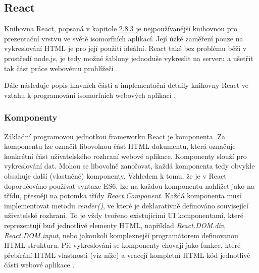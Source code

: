 \subsection{React}
\label{sec:react_isomorphic}
Knihovna React, popsaná v kapitole \hyperref[sec:react]{2.8.3} je nejpoužívanější knihovnou pro prezentační vrstvu ve světě isomorfních aplikací. Její úzké zaměření pouze na vykreslování HTML je pro její použití ideální. React také bez problému běží v prostředí node.js, je tedy možné šablony jednoduše vykreslit na serveru a ušetřit tak část práce webovému prohlížeči \cite{react} \cite{react_intro}.
 
Dále následuje popis hlavních částí a implementační detaily knihovny React ve vztahu k programování isomorfních webových aplikací \cite{isomorhic_book}.

\subsubsection{Komponenty}
Základní programovou jednotkou frameworku React je komponenta. Za komponentu lze označit libovolnou část HTML dokumentu, která označuje konkrétní část uživatelského rozhraní webové aplikace. Komponenty slouží pro vykreslování dat. Mohou se libovolně zanořovat, každá komponenta tedy obvykle obsahuje další (vlastněné) komponenty. Vzhledem k tomu, že je v React doporučováno používat syntaxe ES6, lze na každou komponentu nahlížet jako na třídu, přesněji na potomka třídy \textit{React.Component}. Každá komponenta musí implementovat metodu \textit{render()}, ve které je deklarativně definováno související uživatelské rozhraní. To je vždy tvořeno existujícími UI komponentami, které reprezentují buď jednotlivé elementy HTML, například \textit{React.DOM.div}, \textit{React.DOM.input}, nebo jakoukoli komplexnejší programátorem definovanou HTML strukturu. Při vykreslování se komponenty chovají jako funkce, které přebírání HTML vlastnosti (viz níže) a vracejí kompletní HTML kód jednotlivé části webové aplikace \cite{react} \cite{react_intro}.

